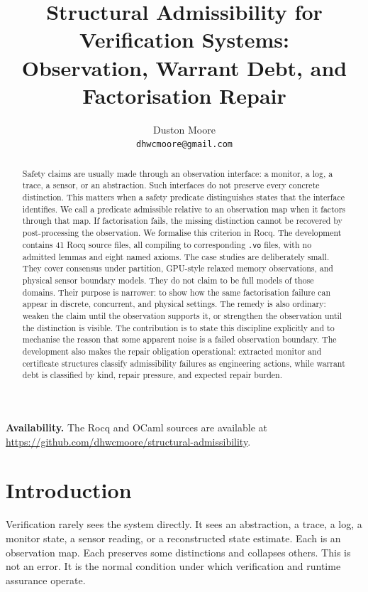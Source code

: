 \documentclass[a4paper,11pt]{article}
\title{%
  Structural Admissibility for Verification Systems:\\
  Observation, Warrant Debt, and Factorisation Repair%
}
\author{%
  Duston Moore\\
  \texttt{dhwcmoore@gmail.com}
}
\date{}
\begin{document}
\maketitle

\begin{abstract}
Safety claims are usually made through an observation interface: a monitor, a
log, a trace, a sensor, or an abstraction. Such interfaces do not preserve every
concrete distinction. This matters when a safety predicate distinguishes states
that the interface identifies. We call a predicate admissible relative to an
observation map when it factors through that map. If factorisation fails, the
missing distinction cannot be recovered by post-processing the observation. We
formalise this criterion in Rocq. The development contains 41 Rocq source
files, all compiling to corresponding \texttt{.vo} files, with no admitted
lemmas and eight named axioms. The case studies are deliberately
small. They cover consensus under partition, GPU-style relaxed memory
observations, and physical sensor boundary models. They do not claim to be full
models of those domains. Their purpose is narrower: to show how the same
factorisation failure can appear in discrete, concurrent, and physical settings.
The remedy is also ordinary: weaken the claim until the observation supports it,
or strengthen the observation until the distinction is visible. The contribution
is to state this discipline explicitly and to mechanise the reason that some
apparent noise is a failed observation boundary.  The
development also makes the repair obligation operational: extracted
monitor and certificate structures classify admissibility failures as engineering
actions, while warrant debt is classified by kind, repair pressure, and expected
repair burden.
\end{abstract}

\noindent\textbf{Availability.} The Rocq and OCaml sources are available at
\url{https://github.com/dhwcmoore/structural-admissibility}.

\section{Introduction}
\label{sec:introduction}

Verification rarely sees the system directly. It sees an abstraction, a trace, a
log, a monitor state, a sensor reading, or a reconstructed state estimate. Each
is an observation map. Each preserves some distinctions and collapses others.
This is not an error. It is the normal condition under which verification and
runtime assurance operate.
\end{document}
